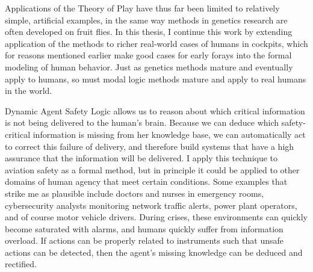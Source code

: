 Applications of the Theory of Play have thus far been limited to relatively simple, artificial examples, in the same way methods in genetics research are often developed on fruit flies. In this thesis, I continue this work by extending application of the methods to richer real-world cases of humans in cockpits, which for reasons mentioned earlier make good cases for early forays into the formal modeling of human behavior. Just as genetics methods mature and eventually apply to humans, so must modal logic methods mature and apply to real humans in the world. 


Dynamic Agent Safety Logic allows us to reason about which critical information is not being delivered to the human's brain. Because we can deduce which safety-critical information is missing from her knowledge base, we can automatically act to correct this failure of delivery, and therefore build systems that have a high assurance that the information will be delivered. I apply this technique to aviation safety as a formal method, but in principle it could be applied to other domains of human agency that meet certain conditions. Some examples that strike me as plausible include doctors and nurses in emergency rooms, cybersecurity analysts monitoring network traffic alerts, power plant operators, and of course motor vehicle drivers. During crises, these environments can quickly become saturated with alarms, and humans quickly suffer from information overload. If actions can be properly related to instruments such that unsafe actions can be detected, then the agent's missing knowledge can be deduced and rectified.

